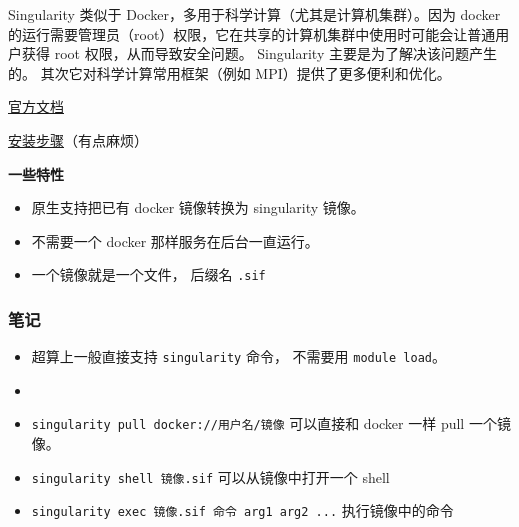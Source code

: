 
\begin{issues}
\issueDraft
\end{issues}

Singularity 类似于 Docker，多用于科学计算（尤其是计算机集群）。因为 docker 的运行需要管理员（root）权限，它在共享的计算机集群中使用时可能会让普通用户获得 root 权限，从而导致安全问题。 Singularity 主要是为了解决该问题产生的。 其次它对科学计算常用框架（例如 MPI）提供了更多便利和优化。

\href{https://docs.sylabs.io/guides/3.0/user-guide/index.html}{官方文档}

\href{https://docs.sylabs.io/guides/3.0/user-guide/quick_start.html#quick-installation-steps}{安装步骤}（有点麻烦）

\textbf{一些特性}
\begin{itemize}
\item 原生支持把已有 docker 镜像转换为 singularity 镜像。
\item 不需要一个 docker 那样服务在后台一直运行。
\item 一个镜像就是一个文件， 后缀名 \verb|.sif|
\end{itemize}


\subsubsection{笔记}
\begin{itemize}
\item 超算上一般直接支持 \verb|singularity| 命令， 不需要用 \verb|module load|。
\item \item \verb|singularity pull docker://用户名/镜像| 可以直接和 docker 一样 pull 一个镜像。
\item \verb|singularity shell 镜像.sif| 可以从镜像中打开一个 shell
\item \verb|singularity exec 镜像.sif 命令 arg1 arg2 ...| 执行镜像中的命令
\end{itemize}
